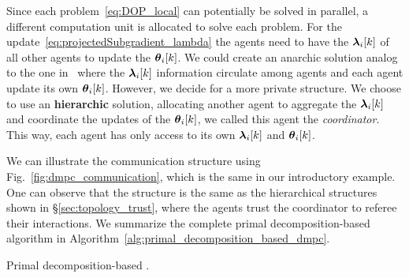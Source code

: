 \documentclass[../main.tex]{subfiles}
\begin{document}
Since each problem~\eqref{eq:DOP_local} can potentially be solved in parallel, a different computation unit is allocated to solve each problem.
For the update~\eqref{eq:projectedSubgradient_lambda} the agents need to have the $\lambdaik$ of all other agents to update the $\thetaik$.
We could create an anarchic solution analog to the one in~\cite{VelardeEtAl2018} where the $\lambdaik$ information circulate among agents and each agent update its own $\thetaik$.
However, we decide for a more private structure.
We choose to use an \textbf{hierarchic} solution, allocating another agent to aggregate the $\lambdaik$ and coordinate the updates of the $\thetaik$, we called this agent the \emph{coordinator}.
This way, each agent has only access to its own $\lambdaik$ and $\thetaik$.

We can illustrate the communication structure using Fig.~\ref{fig:dmpc_communication}, which is the same in our introductory example.
One can observe that the structure is the same as the hierarchical structures shown in \S\ref{sec:topology_trust}, where the agents trust the coordinator to referee their interactions.
We summarize the complete primal decomposition-based \dmpc{} algorithm in Algorithm~\ref{alg:primal_decomposition_based_dmpc}.

\begin{algorithm2e}[h]
  \DontPrintSemicolon%
  \caption{Primal decomposition-based \dmpc{}.}\label{alg:primal_decomposition_based_dmpc}
\end{algorithm2e}
\end{document}
